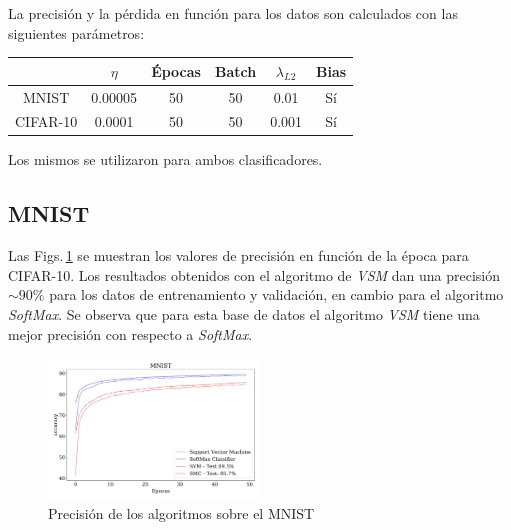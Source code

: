La precisión y la pérdida en función para los datos son calculados con las siguientes parámetros:

\begin{table}[H]
    \centering
    \begin{tabular}{c|c|c|c|c|c}
             &  $\eta$ & Épocas & Batch & $\lambda_{L2}$ & Bias \\ \hline
    MNIST    &  0.00005 & 50 & 50 & 0.01 & Sí \\ \hline
    CIFAR-10 &  0.0001 & 50 & 50 & 0.001 & Sí \\ 
    \end{tabular}
\end{table}
Los mismos se utilizaron para ambos clasificadores.

\subsection*{MNIST} 


Las Figs.\,\ref{fig:ejer5_mnist_acc}  se muestran los valores de precisión en función de la época para CIFAR-10.  Los resultados obtenidos con el algoritmo de \emph{VSM} dan una precisión $\sim90\%$ para los datos de entrenamiento y validación, en cambio para el algoritmo \emph{SoftMax}. Se observa que para esta base de datos el algoritmo \emph{VSM} tiene una mejor precisión con respecto a \emph{SoftMax}.

\begin{figure}[H]
    \centering
    \includegraphics[width=0.5\textwidth]{plots/ejer_5_MNIST_acc.pdf}
    \caption{Precisión de los algoritmos sobre el MNIST}
    \label{fig:ejer5_mnist_acc}
\end{figure} 

